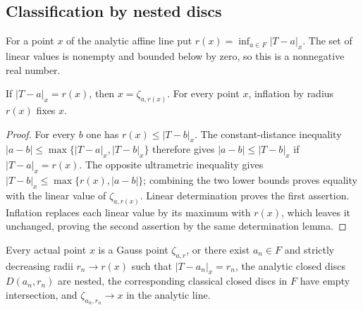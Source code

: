 \subsection{Classification by nested discs}\label{subsec:fc-line-classification}

\begin{definition}\label{def:fc-least-linear-value}
\leanok
{}
For a point $x$ of the analytic affine line put
$r(x)=\inf_{a\in F}|T-a|_x$. The set of linear values is nonempty and
bounded below by zero, so this is a nonnegative real number.
\end{definition}

\begin{lemma}\label{lem:fc-attained-linear-gauss}
\leanok
{}
If $|T-a|_x=r(x)$, then $x=\zeta_{a,r(x)}$. For every point $x$,
inflation by radius $r(x)$ fixes $x$.
\end{lemma}

\begin{proof}
For every $b$ one has $r(x)\le|T-b|_x$. The constant-distance inequality
$|a-b|\le\max\{|T-a|_x,|T-b|_x\}$ therefore gives
$|a-b|\le|T-b|_x$ if $|T-a|_x=r(x)$. The opposite ultrametric inequality
gives $|T-b|_x\le\max\{r(x),|a-b|\}$; combining the two lower bounds
proves equality with the linear value of $\zeta_{a,r(x)}$.
Linear determination proves the first assertion. Inflation replaces each
linear value by its maximum with $r(x)$, which leaves it unchanged, proving
the second assertion by the same determination lemma.
\end{proof}

\begin{theorem}\label{thm:fc-nested-disc-classification}
\leanok
{}
Every actual point $x$ is a Gauss point $\zeta_{a,r}$, or there exist
$a_n\in F$ and strictly decreasing radii $r_n\to r(x)$ such that
$|T-a_n|_x=r_n$, the analytic closed discs $D(a_n,r_n)$ are nested,
the corresponding classical closed discs in $F$ have empty intersection,
and $\zeta_{a_n,r_n}\to x$ in the analytic line.
\end{theorem}

